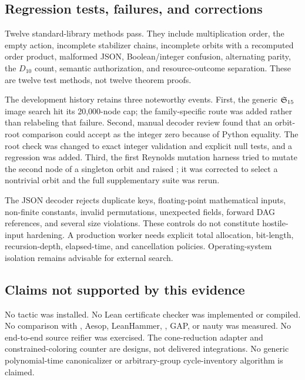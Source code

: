 \subsection{Regression tests, failures, and corrections}
Twelve standard-library  methods pass. They include multiplication order, the empty action, incomplete stabilizer chains, incomplete orbits with a recomputed order product, malformed JSON, Boolean/integer confusion, alternating parity, the $D_{10}$ count, semantic authorization, and resource-outcome separation. These are twelve test methods, not twelve theorem proofs.

The development history retains three noteworthy events. First, the generic $\mathfrak S_{15}$ image search hit its 20,000-node cap; the family-specific route was added rather than relabeling that failure. Second, manual decoder review found that an orbit-root comparison could accept  as the integer zero because of Python equality. The root check was changed to exact integer validation and explicit null tests, and a regression was added. Third, the first Reynolds mutation harness tried to mutate the second node of a singleton orbit and raised ; it was corrected to select a nontrivial orbit and the full supplementary suite was rerun.

The JSON decoder rejects duplicate keys, floating-point mathematical inputs, non-finite constants, invalid permutations, unexpected fields, forward DAG references, and several size violations. These controls do not constitute hostile-input hardening. A production worker needs explicit total allocation, bit-length, recursion-depth, elapsed-time, and cancellation policies. Operating-system isolation remains advisable for external search.

\subsection{Claims not supported by this evidence}
No  tactic was installed. No Lean certificate checker was implemented or compiled. No comparison with , Aesop, LeanHammer, , GAP, or nauty was measured. No end-to-end source reifier was exercised. The cone-reduction adapter and constrained-coloring counter are designs, not delivered integrations. No generic polynomial-time canonicalizer or arbitrary-group cycle-inventory algorithm is claimed.
